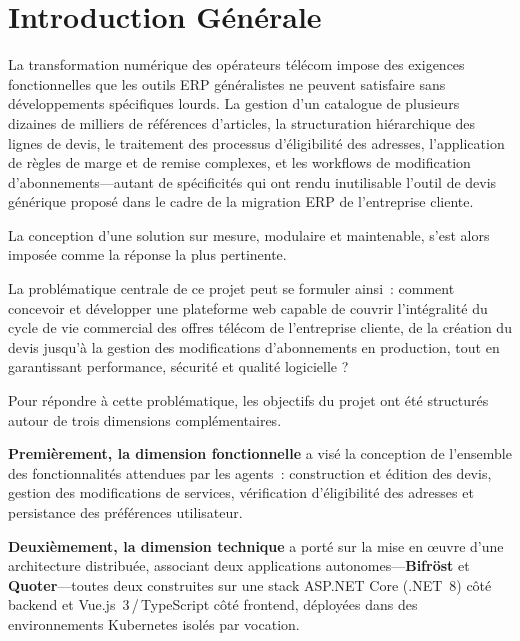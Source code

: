 
\chapter*{Introduction G\'en\'erale}
\label{chap:introduction G\'en\'erale}

La transformation num\'erique des op\'erateurs t\'el\'ecom impose des exigences fonctionnelles que les outils ERP g\'en\'eralistes ne peuvent satisfaire sans d\'eveloppements sp\'ecifiques lourds. La gestion d'un catalogue de plusieurs dizaines de milliers de r\'ef\'erences d'articles, la structuration hi\'erarchique des lignes de devis, le traitement des processus d'\'eligibilit\'e des adresses, l'application de r\`egles de marge et de remise complexes, et les workflows de modification d'abonnements---autant de sp\'ecificit\'es qui ont rendu inutilisable l'outil de devis g\'en\'erique propos\'e dans le cadre de la migration ERP de l'entreprise cliente.

La conception d'une solution sur mesure, modulaire et maintenable, s'est alors impos\'ee comme la r\'eponse la plus pertinente.

\vspace{0.2cm}

La probl\'ematique centrale de ce projet peut se formuler ainsi~: comment concevoir et d\'evelopper une plateforme web capable de couvrir l'int\'egralit\'e du cycle de vie commercial des offres t\'el\'ecom de l'entreprise cliente, de la cr\'eation du devis jusqu'\`a la gestion des modifications d'abonnements en production, tout en garantissant performance, s\'ecurit\'e et qualit\'e logicielle ?

\vspace{0.2cm}

Pour r\'epondre \`a cette probl\'ematique, les objectifs du projet ont \'et\'e structur\'es autour de trois dimensions compl\'ementaires.

\textbf{Premi\`erement, la dimension fonctionnelle} a vis\'e la conception de l'ensemble des fonctionnalit\'es attendues par les agents~: construction et \'edition des devis, gestion des modifications de services, v\'erification d'\'eligibilit\'e des adresses et persistance des pr\'ef\'erences utilisateur.

\textbf{Deuxi\`emement, la dimension technique} a port\'e sur la mise en \oe{}uvre d'une architecture distribu\'ee, associant deux applications autonomes---\textbf{Bifr\"ost} et \textbf{Quoter}---toutes deux construites sur une stack ASP.NET Core (.NET~8) c\^ot\'e backend et Vue.js~3\,/\,TypeScript c\^ot\'e frontend, d\'eploy\'ees dans des environnements Kubernetes isol\'es par vocation.

